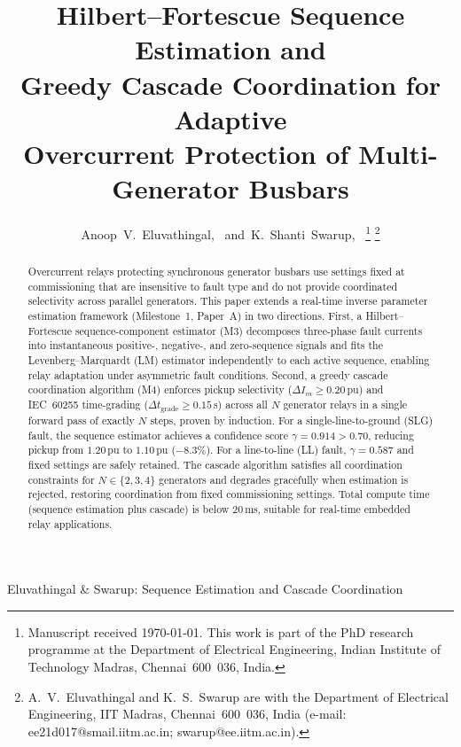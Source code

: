 \documentclass[journal,twoside,10pt]{IEEEtran}
\begin{document}

\title{Hilbert--Fortescue Sequence Estimation and\\
       Greedy Cascade Coordination for Adaptive\\
       Overcurrent Protection of Multi-Generator Busbars}

\author{Anoop~V.~Eluvathingal,~
        and~K.~Shanti~Swarup,~%
\thanks{Manuscript received \today.
        This work is part of the PhD research programme at the Department of
        Electrical Engineering, Indian Institute of Technology Madras,
        Chennai~600~036, India.}%
\thanks{A.~V.~Eluvathingal and K.~S.~Swarup are with the Department of
        Electrical Engineering, IIT Madras, Chennai~600~036, India
        (e-mail: ee21d017@smail.iitm.ac.in; swarup@ee.iitm.ac.in).}}

%
{Eluvathingal \& Swarup: Sequence Estimation and Cascade Coordination}

\maketitle

\begin{abstract}
Overcurrent relays protecting synchronous generator busbars use settings fixed
at commissioning that are insensitive to fault type and do not provide
coordinated selectivity across parallel generators.
This paper extends a real-time inverse parameter estimation framework
(Milestone~1, Paper~A) in two directions.
First, a Hilbert--Fortescue sequence-component estimator (M3) decomposes
three-phase fault currents into instantaneous positive-, negative-, and
zero-sequence signals and fits the Levenberg--Marquardt (LM) estimator
independently to each active sequence, enabling relay adaptation under
asymmetric fault conditions.
Second, a greedy cascade coordination algorithm (M4) enforces pickup
selectivity ($\Delta I_m \geq 0.20$\,pu) and IEC~60255 time-grading
($\Delta t_{\text{grade}} \geq 0.15$\,s) across all $N$ generator relays
in a single forward pass of exactly $N$ steps, proven by induction.
For a single-line-to-ground (SLG) fault, the sequence estimator achieves
a confidence score $\gamma = 0.914 > 0.70$, reducing pickup from
$1.20$\,pu to $1.10$\,pu ($-8.3\%$).
For a line-to-line (LL) fault, $\gamma = 0.587$ and fixed settings are
safely retained.
The cascade algorithm satisfies all coordination constraints for
$N \in \{2,3,4\}$ generators and degrades gracefully when estimation
is rejected, restoring coordination from fixed commissioning settings.
Total compute time (sequence estimation plus cascade) is below 20\,ms,
suitable for real-time embedded relay applications.
\end{abstract}
\end{document}
